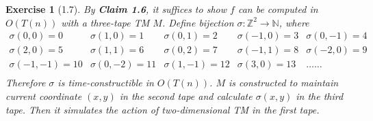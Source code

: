 \documentclass[a4paper]{article}
\newtheorem*{exercise}{Exercise}
\begin{document}
\begin{exercise}[1.7]
    By \textbf{Claim 1.6}, it suffices to show $f$ can be computed in $O(T(n))$ with a three-tape TM $M$.
    Define bijection $\sigma:\mathbb Z^2\to\mathbb N$, where
    $$
    \begin{matrix}
        \sigma(0,0)=0 & \sigma(1,0)=1 & \sigma(0,1)=2 & \sigma(-1,0)=3 & \sigma(0,-1)=4\\
        \sigma(2,0)=5 & \sigma(1,1)=6 & \sigma(0,2)=7 & \sigma(-1,1)=8 & \sigma(-2,0)=9\\
        \sigma(-1,-1)=10 & \sigma(0,-2)=11 & \sigma(1,-1)=12 & \sigma(3,0)=13 & \dots\dots\\
    \end{matrix}
    $$
    Therefore $\sigma$ is time-constructible in $O(T(n))$.
    $M$ is constructed to maintain current coordinate $(x,y)$ in the second tape 
    and calculate $\sigma(x,y)$ in the third tape.
    Then it simulates the action of two-dimensional TM in the first tape.
\end{exercise}
\end{document}
